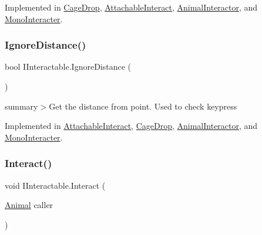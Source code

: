 Implemented in \mbox{\hyperlink{class_cage_drop_a57457a58730ee0fbad7693ef9d9a78d7}{Cage\+Drop}}, \mbox{\hyperlink{class_attachable_interact_abeaa046ec8352957e008cde245fd4f65}{Attachable\+Interact}}, \mbox{\hyperlink{class_animal_interactor_a92693dc7d95858e69c2f787507f14acb}{Animal\+Interactor}}, and \mbox{\hyperlink{class_mono_interacter_aa94f17988ac01fa0c8feac0406a775f0}{Mono\+Interacter}}.

\mbox{\label{interface_i_interactable_ad184024a0cc6bce38ebcd77c0126fcc5}} 
\subsubsection{\texorpdfstring{Ignore\+Distance()}{IgnoreDistance()}}
{\footnotesize\ttfamily bool I\+Interactable.\+Ignore\+Distance (\begin{DoxyParamCaption}{ }\end{DoxyParamCaption})}



summary$>$Get the distance from point. Used to check keypress



Implemented in \mbox{\hyperlink{class_attachable_interact_a2778c59435948c3a3794664ceadc0c7f}{Attachable\+Interact}}, \mbox{\hyperlink{class_cage_drop_a4f05fa4967d7317ffd43b8e7b9e42e3d}{Cage\+Drop}}, \mbox{\hyperlink{class_animal_interactor_a51de9b553e86019f8d45d10915fe960c}{Animal\+Interactor}}, and \mbox{\hyperlink{class_mono_interacter_adbdd4ad781e4fce595a14c2ee6258463}{Mono\+Interacter}}.

\mbox{\label{interface_i_interactable_ae38fb77e97bc1066db045b32db647681}} 
\subsubsection{\texorpdfstring{Interact()}{Interact()}}
{\footnotesize\ttfamily void I\+Interactable.\+Interact (\begin{DoxyParamCaption}\item[{\mbox{\hyperlink{class_animal}{Animal}}}]{caller }\end{DoxyParamCaption})}



